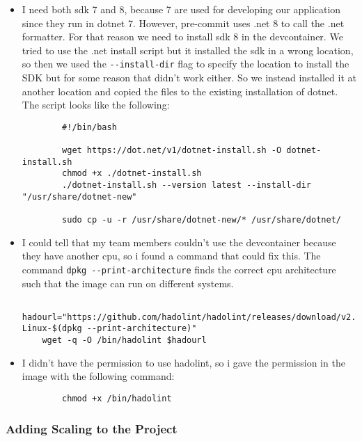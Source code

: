 \begin{itemize}
    \item I need both sdk 7 and 8, because 7 are used for developing our application since they run in dotnet 7. However, pre-commit uses .net 8 to call the .net formatter. For that reason we need to install sdk 8 in the devcontainer. We tried to use the .net install script but it installed the sdk in a wrong location, so then we used the \texttt{-\/-install-dir} flag to specify the location to install the SDK but for some reason that didn't work either. So we instead installed it at another location and copied the files to the existing installation of dotnet. The script looks like the following:

    \begin{verbatim}
        #!/bin/bash

        wget https://dot.net/v1/dotnet-install.sh -O dotnet-install.sh
        chmod +x ./dotnet-install.sh
        ./dotnet-install.sh --version latest --install-dir "/usr/share/dotnet-new"

        sudo cp -u -r /usr/share/dotnet-new/* /usr/share/dotnet/
    \end{verbatim}

    \item I could tell that my team members couldn't use the devcontainer because they have another cpu, so i found a command that could fix this. The command \texttt{dpkg\ -\/-print-architecture} finds the correct cpu architecture such that the image can run on different systems.
    \begin{verbatim}
    hadourl="https://github.com/hadolint/hadolint/releases/download/v2.10.0/hadolint-Linux-$(dpkg --print-architecture)"
    wget -q -O /bin/hadolint $hadourl
    \end{verbatim}

    \item I didn't have the permission to use hadolint, so i gave the permission in the image with the following command:
    \begin{verbatim}
        chmod +x /bin/hadolint
    \end{verbatim}
\end{itemize}

\subsubsection{Adding Scaling to the Project}
\label{log:adding-scaling-to-the-project}

